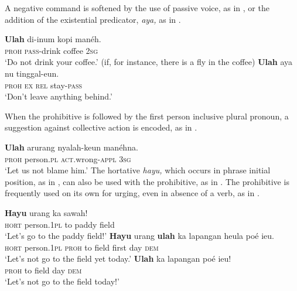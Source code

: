 \documentclass[output=paper]{langscibook}
\begin{document}
A negative command is softened by the use of passive voice, as in , or the addition of the existential predicator, \textit{aya,} as in . 

\ea\label{ex:sun:13}
    \ea\label{ex:sun:13a}
        \gll  \textbf{Ulah} di-inum kopi manéh.\\ 
              \textsc{proh} \textsc{pass}{}-drink coffee 2\textsc{sg}\\
        \glt ‘Do not drink your coffee.’ (if, for instance, there is a fly in the coffee)
    \ex\label{ex:sun:13b}
        \gll  \textbf{Ulah} aya nu tinggal-eun.\\
              \textsc{proh} \textsc{ex} \textsc{rel} stay-\textsc{pass}\\
        \glt ‘Don’t leave anything behind.’ \citep[149]{Butters2021}
    \z
\z 

When the prohibitive is followed by the first person inclusive plural pronoun, a suggestion against collective action is encoded, as in . 

\ea\label{ex:sun:14} 
    \gll  \textbf{Ulah} arurang nyalah-keun manéhna.\\ 
          \textsc{proh} person.\textsc{pl} \textsc{act}.wrong-\textsc{appl} 3\textsc{sg}\\
    \glt ‘Let us not blame him.’ \citep[148]{Butters2021}
\z 
The hortative \textit{hayu,} which occurs in phrase initial position, as in , can also be used with the prohibitive, as in . The prohibitive is frequently used on its own for urging, even in absence of a verb, as in . 
 
\ea\label{ex:sun:15}
    \ea\label{ex:sun:15a}
        \gll  \textbf{Hayu} urang ka sawah!\\ 
              \textsc{hort} person.1\textsc{pl} to paddy field\\
        \glt ‘Let’s go to the paddy field!’
    \ex\label{ex:sun:15b}
        \gll  \textbf{Hayu} urang \textbf{ulah} ka lapangan heula poé ieu.\\
              \textsc{hort} person.1\textsc{pl} \textsc{proh} to field first day \textsc{dem}\\
        \glt ‘Let’s not go to the field yet today.’
    \ex\label{ex:sun:15c}
        \gll  \textbf{Ulah} ka lapangan poé ieu!\\
              \textsc{proh} to field day \textsc{dem}\\
        \glt ‘Let’s not go to the field today!’ 
    \z
\z 
\end{document}

